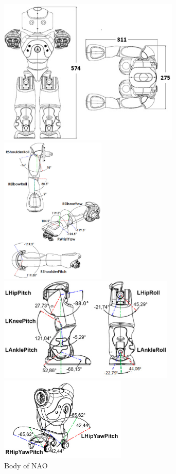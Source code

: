 \begin{figure}
	\begin{minipage}
		{.6
			\textwidth} 
		\includegraphics[height=7cm]{figures/content/nao-body.jpg} 
	\end{minipage}
	\begin{minipage}
		{.4 
			\textwidth} 
		\includegraphics[height=7cm]{figures/content/nao-hand.jpg} 
	\end{minipage}
	\begin{minipage}
		{.6 
			\textwidth} 
		\includegraphics[height=50mm]{figures/content/nao-leg.jpg} 
	\end{minipage}
	\begin{minipage}
		{.4 
			\textwidth} 
		\includegraphics[height=40mm]{figures/content/nao-hip.jpg} 
	\end{minipage}
	\caption{Body of NAO} \label{fg:nao:body} 
\end{figure}
